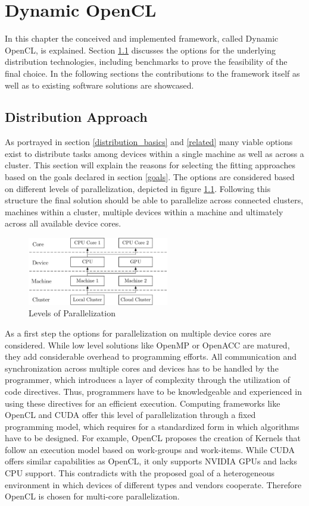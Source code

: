 \chapter{Dynamic OpenCL}

In this chapter the conceived and implemented framework, called Dynamic OpenCL, is explained. Section \ref{distribution} discusses the options for the underlying distribution technologies, including benchmarks to prove the feasibility of the final choice. In the following sections the contributions to the framework itself as well as to existing software solutions are showcased.

\section{Distribution Approach}
\label{distribution}
As portrayed in section \ref{distribution_basics} and \ref{related} many viable options exist to distribute tasks among devices within a single machine as well as across a cluster. This section will explain the reasons for selecting the fitting approaches based on the goals declared in section \ref{goals}. The options are considered based on different levels of parallelization, depicted in figure \ref{img:parallelization_levels}. Following this structure the final solution should be able to parallelize across connected clusters, machines within a cluster, multiple devices within a machine and ultimately across all available device cores.

\begin{figure}[H]
	\includegraphics[width=0.55\textwidth]{drawings/parallelization_struct.pdf}
	\centering
	\caption{Levels of Parallelization}
	\label{img:parallelization_levels}
\end{figure}

As a first step the options for parallelization on multiple device cores are considered. While low level solutions like OpenMP or OpenACC are matured, they add considerable overhead to programming efforts. All communication and synchronization across multiple cores and devices has to be handled by the programmer, which introduces a layer of complexity through the utilization of code directives. Thus, programmers have to be knowledgeable and experienced in using these directives for an efficient execution. Computing frameworks like OpenCL and CUDA offer this level of parallelization through a fixed programming model, which requires for a standardized form in which algorithms have to be designed. For example, OpenCL proposes the creation of Kernels that follow an execution model based on work-groups and work-items. While CUDA offers similar capabilities as OpenCL, it only supports NVIDIA GPUs and lacks CPU support. This contradicts with the proposed goal of a heterogeneous environment in which devices of different types and vendors cooperate. Therefore OpenCL is chosen for multi-core parallelization.

